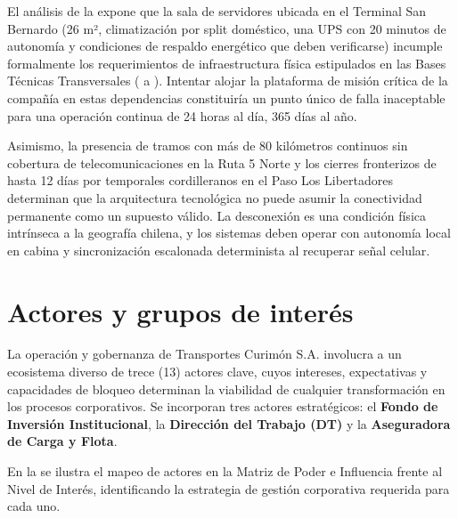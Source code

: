 El análisis de la  expone que la sala de servidores ubicada en el Terminal San Bernardo (26 m², climatización por split doméstico, una UPS con 20 minutos de autonomía y condiciones de respaldo energético que deben verificarse) incumple formalmente los requerimientos de infraestructura física estipulados en las Bases Técnicas Transversales ( a ). Intentar alojar la plataforma de misión crítica de la compañía en estas dependencias constituiría un punto único de falla inaceptable para una operación continua de 24 horas al día, 365 días al año.

Asimismo, la presencia de tramos con más de 80 kilómetros continuos sin cobertura de telecomunicaciones en la Ruta 5 Norte y los cierres fronterizos de hasta 12 días por temporales cordilleranos en el Paso Los Libertadores determinan que la arquitectura tecnológica no puede asumir la conectividad permanente como un supuesto válido. La desconexión es una condición física intrínseca a la geografía chilena, y los sistemas deben operar con autonomía local en cabina y sincronización escalonada determinista al recuperar señal celular.

\section{Actores y grupos de interés}\label{sec:2-actores}

La operación y gobernanza de Transportes Curimón S.A. involucra a un ecosistema diverso de trece (13) actores clave, cuyos intereses, expectativas y capacidades de bloqueo determinan la viabilidad de cualquier transformación en los procesos corporativos. Se incorporan tres actores estratégicos: el \textbf{Fondo de Inversión Institucional}, la \textbf{Dirección del Trabajo (DT)} y la \textbf{Aseguradora de Carga y Flota}.

En la  se ilustra el mapeo de actores en la Matriz de Poder e Influencia frente al Nivel de Interés, identificando la estrategia de gestión corporativa requerida para cada uno.


